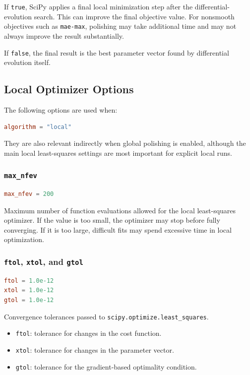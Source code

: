\documentclass[11pt]{article}
\begin{document}
If \texttt{true}, SciPy applies a final local minimization step after the
differential-evolution search. This can improve the final objective value. For
nonsmooth objectives such as \texttt{mae-max}, polishing may take additional
time and may not always improve the result substantially.

If \texttt{false}, the final result is the best parameter vector found by
differential evolution itself.

\subsection{Local Optimizer Options}

The following options are used when:

\begin{lstlisting}[language=toml]
algorithm = "local"
\end{lstlisting}

They are also relevant indirectly when global polishing is enabled, although the
main local least-squares settings are most important for explicit local runs.

\subsubsection{\texttt{max\_nfev}}

\begin{lstlisting}[language=toml]
max_nfev = 200
\end{lstlisting}

Maximum number of function evaluations allowed for the local least-squares
optimizer. If the value is too small, the optimizer may stop before fully
converging. If it is too large, difficult fits may spend excessive time in local
optimization.

\subsubsection{\texttt{ftol}, \texttt{xtol}, and \texttt{gtol}}

\begin{lstlisting}[language=toml]
ftol = 1.0e-12
xtol = 1.0e-12
gtol = 1.0e-12
\end{lstlisting}

Convergence tolerances passed to \texttt{scipy.optimize.least\_squares}.

\begin{itemize}[leftmargin=*]
  \item \texttt{ftol}: tolerance for changes in the cost function.
  \item \texttt{xtol}: tolerance for changes in the parameter vector.
  \item \texttt{gtol}: tolerance for the gradient-based optimality condition.
\end{itemize}
\end{document}
